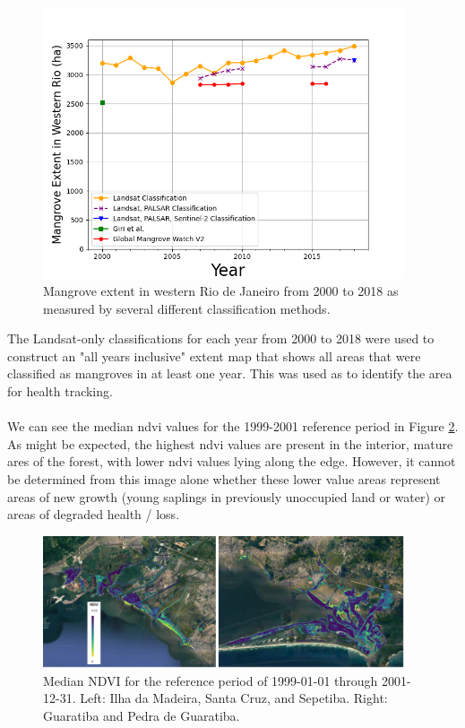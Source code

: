 \begin{figure}[H] 
\centering
\includegraphics[width=0.95\textwidth]{Figures/chap4/extent_over_time.png}
\caption[Mangrove Extent Over Time]{Mangrove extent in western Rio de Janeiro from 2000 to 2018 as measured by several different classification methods.}
\label{fig:extent-over-time}
\end{figure}

The Landsat-only classifications for each year from 2000 to 2018 were used to construct an "all years inclusive" extent map that shows all areas that were classified as mangroves in at least one year. This was used as to identify the area for health tracking.

\paragraph{} \leavevmode\newline

We can see the median \ac{ndvi} values for the 1999-2001 reference period in Figure \ref{fig:reference_median}. As might be expected, the highest \ac{ndvi} values are present in the interior, mature ares of the forest, with lower \ac{ndvi} values lying along the edge. However, it cannot be determined from this image alone whether these lower value areas represent areas of new growth (young saplings in previously unoccupied land or water) or areas of degraded health / loss.  

\begin{figure}[H] 
\centering
\includegraphics[width=0.95\textwidth]{Figures/chap4/reference_median.png}
\caption[Reference Median NDVI of Region]{Median NDVI for the reference period of 1999-01-01 through 2001-12-31. Left: Ilha da Madeira, Santa Cruz, and Sepetiba. Right: Guaratiba and Pedra de Guaratiba.}
\label{fig:reference_median}
\end{figure}

